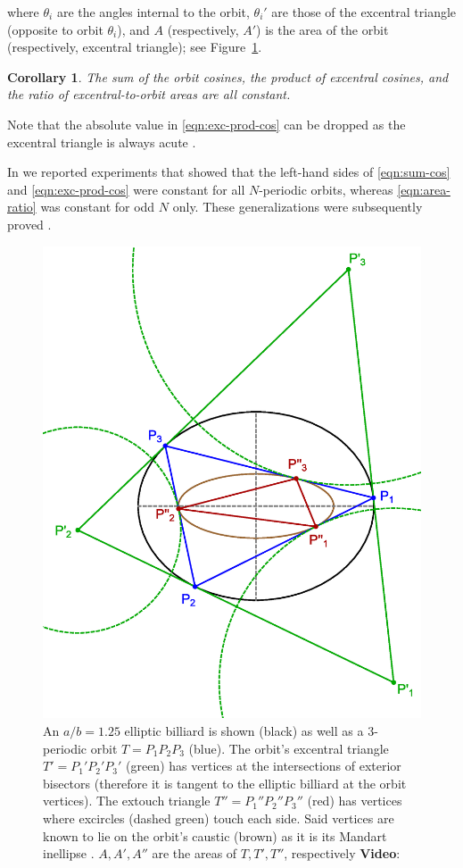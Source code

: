 \documentclass{amsart}
\newtheorem{corollary}{Corollary}
\theoremstyle{definition}
\begin{document}
\noindent where $\theta_i$ are the angles internal to the orbit, $\theta_i'$ are those of the excentral triangle (opposite to orbit $\theta_i$), and $A$ (respectively, $A'$) is the area of the orbit (respectively, excentral triangle); see Figure~\ref{fig:orbit-outer-inner}.

\begin{corollary}
The sum of the orbit cosines, the product of excentral cosines, and the ratio of excentral-to-orbit areas are all constant.
\end{corollary}

Note that the absolute value in \eqref{eqn:exc-prod-cos} can be dropped as the excentral triangle is always acute \cite{coxeter67}.

In \cite{reznik2019-intelligencer} we reported experiments that showed that the left-hand sides of \eqref{eqn:sum-cos} and \eqref{eqn:exc-prod-cos} were constant for all $N$-periodic orbits, whereas \eqref{eqn:area-ratio} was constant for odd $N$ only. These generalizations were subsequently proved \cite{akopyan2020-invariants,bialy2020-invariants}.

\begin{figure}[H]
    \centering
    \includegraphics[width=.6\textwidth]{1090_orbit_outer_inner}
    \caption{An $a/b=1.25$ elliptic billiard is shown (black) as well as a 3-periodic orbit $T=P_1P_2P_3$ (blue). The orbit's excentral triangle $T'=P_1'P_2'P_3'$ (green) has vertices at the intersections of exterior bisectors (therefore it is tangent to the elliptic billiard at the orbit vertices). The extouch triangle $T''=P_1''P_2''P_3''$ (red) has vertices   where excircles (dashed green) touch each side. Said vertices are known to lie on the orbit's caustic (brown) as it is its Mandart inellipse \cite[Mandart Inellipse]{mw}.  $A,A',A''$ are the areas of $T,T',T''$, respectively \textbf{Video}: \cite[PL\#06]{reznik2020-playlist-proofs}}
    \label{fig:orbit-outer-inner}
\end{figure}
\end{document}
